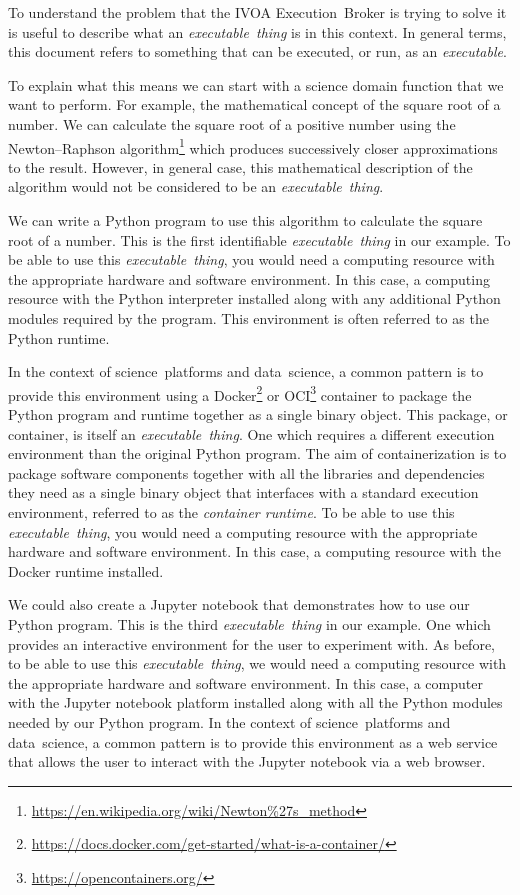 \documentclass[11pt,a4paper]{ivoa}
\newcommand{\webservice} {web service}
\newcommand{\webbrowser} {web browser}
\newcommand{\ivoa} {IVOA}
\newcommand{\executionbroker} {Execution~Broker}
\newcommand{\jupyternotebook} {Jupyter notebook}
\newcommand{\python} {Python}
\newcommand{\pythonprogram} {Python program}
\newcommand{\dockerruntime} {Docker runtime}
\newcommand{\footurl}[1] {\footnote{\url{#1}}}
\newcommand{\datascience} {data~science}
\newcommand{\scienceplatform}[1] {science~platform#1}
\newcommand{\executable} {\textit{executable}}
\newcommand{\executablething}[1] {\textit{executable~thing#1}}
\begin{document}
To understand the problem that the \ivoa{} \executionbroker{} is trying to solve
it is useful to describe what an \executablething{} is in this context.
In general terms, this document refers to something that can be executed, or run,
as an \executable{}.

To explain what this means we can start with a science domain function that we want to perform.
For example, the mathematical concept of the square root of a number.
We can calculate the square root of a positive number using the Newton–Raphson
algorithm\footurl{https://en.wikipedia.org/wiki/Newton\%27s_method}
which produces successively closer approximations to the result.
However, in general case, this mathematical description of the algorithm would not be
considered to be an \executablething{}.

We can write a \pythonprogram{} to use this algorithm to calculate the square root of a number.
This is the first identifiable \executablething{} in our example.
To be able to use this \executablething{}, you would need a computing resource with the appropriate
hardware and software environment. In this case, a computing resource with the \python{} interpreter
installed along with any additional \python{} modules required by the program.
This environment is often referred to as the \python{} runtime.

In the context of \scienceplatform{s} and \datascience{}, a common pattern is to provide this environment
using a Docker\footurl{https://docs.docker.com/get-started/what-is-a-container/}
or OCI\footurl{https://opencontainers.org/} container
to package the \pythonprogram{} and runtime together as a single binary object.
This package, or container, is itself an \executablething{}. One which requires a different execution
environment than the original \pythonprogram{}.
The aim of containerization is to package software components together with all the libraries and dependencies
they need as a single binary object that interfaces with a standard execution environment,
referred to as the \textit{container runtime}.
To be able to use this \executablething{}, you would need a computing resource with the appropriate
hardware and software environment. In this case, a computing resource with the \dockerruntime{} installed.

We could also create a \jupyternotebook{} that demonstrates how to use our \pythonprogram{}.
This is the third \executablething{} in our example.
One which provides an interactive environment for the user to experiment with.
As before, to be able to use this \executablething{}, we would need a computing resource with
the appropriate hardware and software environment.
In this case, a computer with the \jupyternotebook{} platform installed along with all the \python{} modules
needed by our \pythonprogram{}.
In the context of \scienceplatform{s} and \datascience{}, a common pattern is to provide this environment as a \webservice{}
that allows the user to interact with the \jupyternotebook{} via a \webbrowser.
\end{document}
